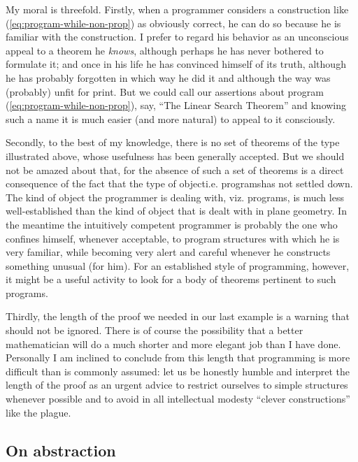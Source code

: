 My moral is threefold. Firstly, when a programmer considers a construction like (\ref{eq:program-while-non-prop}) as obviously correct, he can do so because he is familiar with the construction. I prefer to regard his behavior as an unconscious appeal to a theorem he \textit{knows}, although perhaps he has never bothered to formulate it; and once in his life he has convinced himself of its truth, although he has probably forgotten in which way he did it and although the way was (probably) unfit for print. But we could call our assertions about program (\ref{eq:program-while-non-prop}), say, ``The Linear Search Theorem'' and knowing such a name it is much easier (and more natural) to appeal to it consciously.

Secondly, to the best of my knowledge, there is no set of theorems of the type illustrated above, whose usefulness has been generally accepted. But we should not be amazed about that, for the absence of such a set of theorems is a direct consequence of the fact that the type of object\textemdash{}i.e. programs\textemdash{}has not settled down. The kind of object the programmer is dealing with, viz. programs, is much less well-established than the kind of object that is dealt with in plane geometry. In the meantime the intuitively competent programmer is probably the one who confines himself, whenever acceptable, to program structures with which he is very familiar, while becoming very alert and careful whenever he constructs something unusual (for him). For an established style of programming, however, it might be a useful activity to look for a body of theorems pertinent to such programs.

Thirdly, the length of the proof we needed in our last example is a warning that should not be ignored. There is of course the possibility that a better mathematician will do a much shorter and more elegant job than I have done. Personally I am inclined to conclude from this length that programming is more difficult than is commonly assumed: let us be honestly humble and interpret the length of the proof as an urgent advice to restrict ourselves to simple structures whenever possible and to avoid in all intellectual modesty ``clever constructions'' like the plague.

\subsection{On abstraction}

